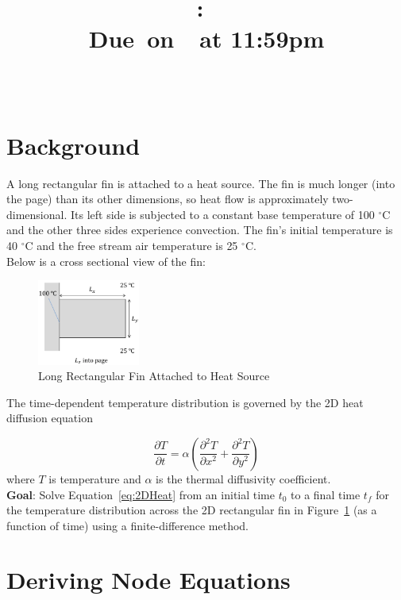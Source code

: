 \documentclass{article}
\title{
    \vspace{2in}
    \textmd{\textbf{\hmwkClass:\ \hmwkTitle}}\\
    \normalsize\vspace{0.1in}\small{Due\ on\ \hmwkDueDate\ at 11:59pm}\\
    \vspace{0.1in}\large{\textit{\hmwkClassInstructor\ \hmwkClassTime}}
    \vspace{3in}
}
\author{\hmwkAuthorName}
\date{}
\newcommand{\pderiv}[2]{\displaystyle \frac{\partial #1}{\partial #2}}
\begin{document}
\maketitle

\pagebreak

\section{Background}
A long rectangular fin is attached to a heat source. The fin is much longer (into the page) than its other
dimensions, so heat flow is approximately two-dimensional. Its left side is subjected to a constant base
temperature of 100 ${}^{\circ}$C and the other three sides experience convection. The fin's initial temperature is\\ 
40 ${}^{\circ}$C and the free stream air temperature is 25 ${}^{\circ}$C. \\

Below is a cross sectional view of the fin:

\begin{figure}[h]
    \centering
    \includegraphics[width=0.3\textwidth]{fig/fin.png}
    \caption{Long Rectangular Fin Attached to Heat Source}
    \label{fig:fin}
\end{figure}

The time-dependent temperature distribution is governed by the 2D heat diffusion equation

\begin{equation}
    \pderiv{T}{t} = \alpha \left( \pderiv{^2 T}{x^2} + \pderiv{^2 T}{y^2}\right)
    \label{eq:2DHeat}
\end{equation}
where $T$ is temperature and $\alpha$ is the thermal diffusivity coefficient.\\

\textbf{Goal}: Solve Equation~\eqref{eq:2DHeat} from an initial time $t_0$ to a final time $t_f$ for the temperature distribution across the 2D rectangular fin in Figure~\ref{fig:fin} (as a function of time) using a finite-difference method.

\pagebreak

\section{Deriving Node Equations}
\end{document}
